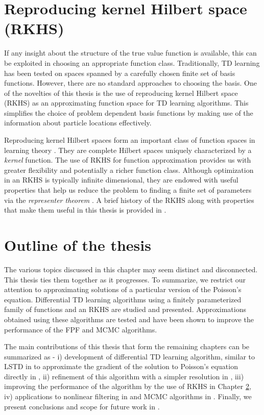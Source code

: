 \section{Reproducing kernel Hilbert space (RKHS)}
 If any insight about the structure of the true value function is available, this can be exploited in choosing an appropriate function class. Traditionally, TD learning has been tested on spaces spanned by a carefully chosen finite set of basis functions. However, there are no standard approaches to choosing the basis. One of the novelties of this thesis is the use of reproducing kernel Hilbert space (RKHS) as an approximating function space for TD learning algorithms. This simplifies the choice of problem dependent basis functions by making use of the information about particle locations effectively. 
 
Reproducing kernel Hilbert spaces form an important class of function spaces in learning theory \cite{aro50, schsmo01}. They are complete Hilbert spaces uniquely characterized by a \textit{kernel} function. The use of RKHS for function approximation provides us with greater flexibility and potentially a richer function class. Although optimization in an RKHS is typically infinite dimensional, they are endowed with useful properties that help us reduce the problem to finding a finite set of parameters via the \textit{representer theorem} \cite{kimwah71, schhersmo01}. A brief history of the RKHS along with properties that make them useful in this thesis is provided in \Chapter{}. 
 

\section{Outline of the thesis}
The various topics discussed in this chapter may seem distinct and disconnected. This thesis ties them together as it progresses. To summarize, we restrict our attention to approximating solutions of a particular version of the Poisson's equation. Differential TD learning algorithms using a finitely parameterized family of functions and an RKHS are studied and presented. Approximations obtained using these algorithms are tested and have been shown to improve the performance of the FPF and MCMC algorithms. 

The main contributions of this thesis that form the remaining chapters can be summarized as - i) development of differential TD learning algorithm, similar to LSTD in \cite{ctcn} to approximate the gradient of the solution to Poisson's equation directly in , ii) refinement of this algorithm with a simpler resolution \cite{radmey18a} in \Chapter{}, iii) improving the performance of the algorithm by the use of RKHS in Chapter \ref{}, iv) applications to nonlinear filtering in \Chapter{} and MCMC algorithms in \Chapter{}. Finally, we present conclusions and scope for future work in \Chapter{}.  

